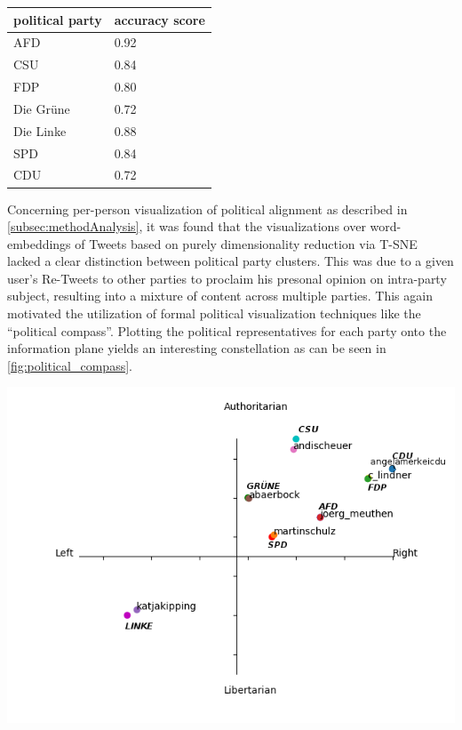\documentclass[10pt, oneside]{article}
\newenvironment{Figure}
	{\par\medskip\noindent\minipage{\linewidth}}
	{\endminipage\par\medskip}
\begin{document}
\begin{multicols}{2}
\begin{center}
	\begin{tabular}{|l|l|}
	\hline
	\textbf{political party} & \textbf{accuracy score} \\ \hline
	AFD & 0.92 \\
	CSU & 0.84 \\
	FDP & 0.80 \\
	Die Grüne & 0.72 \\
	Die Linke & 0.88 \\
	SPD & 0.84 \\
	CDU & 0.72 \\
	\hline
	\end{tabular}
	\label{tbl:majorityVotingAccuracyScores}
\end{center}

Concerning per-person visualization of political alignment as described in \autoref{subsec:methodAnalysis}, it was found that the visualizations over word-embeddings of Tweets based on purely dimensionality reduction via T-SNE lacked a clear distinction between political party clusters. This was due to a given user's Re-Tweets to other parties to proclaim his presonal opinion on intra-party subject, resulting into a mixture of content across multiple parties.
This again motivated the utilization of formal political visualization techniques like the ``political compass''. Plotting the political representatives for each party onto the information plane yields an interesting constellation as can be seen in \autoref{fig:political_compass}.

\begin{Figure}
	\centering
	\includegraphics[width=\linewidth]{images/Political_Compass-finalv2.png}
	\label{fig:political_compass}
\end{Figure}


\end{multicols}
\end{document}
